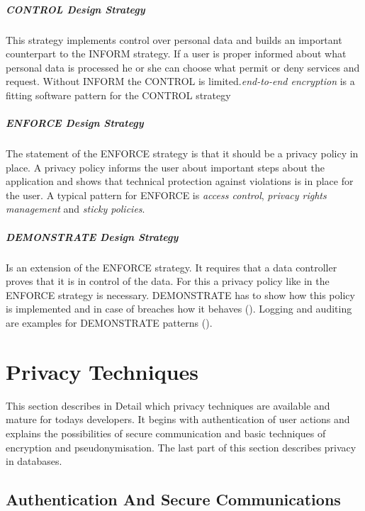 \subparagraph{CONTROL Design Strategy}
This strategy implements control over personal data and builds an important counterpart to the INFORM strategy. If a user is proper informed about what personal data is processed he or she can choose what permit or deny services and request. Without INFORM the CONTROL is limited.\textit{end-to-end encryption} is a fitting software pattern for the CONTROL strategy  

\subparagraph{ENFORCE Design Strategy}
The statement of the ENFORCE strategy is that it should be a privacy policy in place. A privacy policy informs the user about important steps about the application and shows that technical protection against violations is in place for the user. A typical pattern for ENFORCE is \textit{access control}, \textit{privacy rights management} and \textit{sticky policies}.

\subparagraph{DEMONSTRATE Design Strategy}
Is an extension of the ENFORCE strategy. It requires that a data controller proves that it is in control of the data. For this a privacy policy like in the ENFORCE strategy is necessary. DEMONSTRATE has to show how this policy is implemented and in case of breaches how it behaves (\cite{langheinrich2001privacy}). Logging and auditing are examples for DEMONSTRATE patterns (\cite{katsikas2005trust}).

\section{Privacy Techniques}
 
 This section describes in Detail which privacy techniques are available and mature for todays developers. It begins with authentication of user actions and explains the possibilities of secure communication and basic techniques of encryption and pseudonymisation. The last part of this section describes privacy in databases.

 \subsection{Authentication And Secure Communications}

